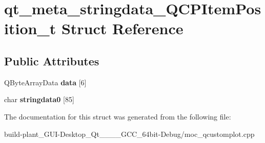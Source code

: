 \hypertarget{structqt__meta__stringdata__QCPItemPosition__t}{}\section{qt\+\_\+meta\+\_\+stringdata\+\_\+\+Q\+C\+P\+Item\+Position\+\_\+t Struct Reference}
\label{structqt__meta__stringdata__QCPItemPosition__t}
\subsection*{Public Attributes}
\begin{DoxyCompactItemize}
\item 
\mbox{\label{structqt__meta__stringdata__QCPItemPosition__t_a7efdce6b4c431297ac7218626630d15f}} 
Q\+Byte\+Array\+Data {\bfseries data} \mbox{[}6\mbox{]}
\item 
\mbox{\label{structqt__meta__stringdata__QCPItemPosition__t_a0321410c49080a232c195e07eac0ea1a}} 
char {\bfseries stringdata0} \mbox{[}85\mbox{]}
\end{DoxyCompactItemize}


The documentation for this struct was generated from the following file\+:\begin{DoxyCompactItemize}
\item 
build-\/plant\+\_\+\+G\+U\+I-\/\+Desktop\+\_\+\+Qt\+\_\+\_\+\_\+\_\+\+G\+C\+C\+\_\+64bit-\/\+Debug/moc\+\_\+qcustomplot.\+cpp\end{DoxyCompactItemize}
